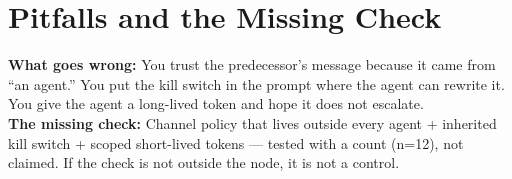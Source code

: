 \section{Pitfalls and the Missing Check}
\begin{pitfallbox}
\textbf{What goes wrong:} You trust the predecessor's message because it came from ``an agent.'' You put the kill switch in the prompt where the agent can rewrite it. You give the agent a long-lived token and hope it does not escalate.\\[4pt]
\textbf{The missing check:} Channel policy that lives outside every agent + inherited kill switch + scoped short-lived tokens — tested with a count (n=12), not claimed. If the check is not outside the node, it is not a control.
\end{pitfallbox}

